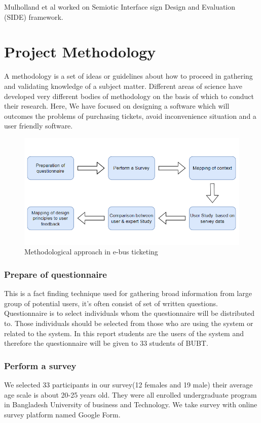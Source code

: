 \documentclass[runningheads]{llncs}
\begin{document}
Mulholland et al worked on Semiotic Interface sign Design and Evaluation (SIDE) framework.\\
\vspace{4.5 in}
\section{Project Methodology}
A methodology is a set of ideas or guidelines about how to proceed in gathering and validating knowledge of a subject matter. Different areas of science have developed very different bodies of methodology on the basis of which to conduct their research. Here, We have focused on designing a software which will outcomes the problems of purchasing tickets, avoid inconvenience situation and a user friendly software.


\begin{figure}[h]
\centerline{\includegraphics[width=\textwidth]{context diagram of eticket.png}}
\caption{Methodological approach in e-bus ticketing}
\label{fig}
\end{figure}

\subsubsection{Prepare of questionnaire}
This is a fact finding technique used for gathering broad information from large group of
potential users, it’s often consist of set of written questions. Questionnaire is to select
individuals whom the questionnaire will be distributed to. Those individuals should be selected
from those who are using the system or related to the system. In this report students are the
users of the system and therefore the questionnaire will be given to 33 students of BUBT.

\subsubsection{Perform a survey}
We selected 33 participants in our survey(12 females and 19 male) their average age scale is about 20-25 years old. They were all enrolled undergraduate program in Bangladesh University of business and Technology. We take survey with online survey platform named Google Form.
\end{document}
